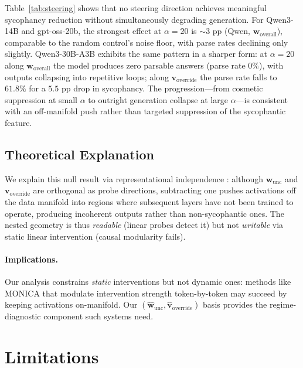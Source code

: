 \documentclass[11pt]{article}
\begin{document}
Table~\ref{tab:steering} shows that no steering direction achieves meaningful sycophancy reduction without simultaneously degrading generation.
For Qwen3-14B and gpt-oss-20b, the strongest effect at $\alpha = 20$ is $\sim$3 pp (Qwen, $\mathbf{w}_{\text{overall}}$), comparable to the random control's noise floor, with parse rates declining only slightly.
Qwen3-30B-A3B exhibits the same pattern in a sharper form: at $\alpha = 20$ along $\mathbf{w}_{\text{overall}}$ the model produces zero parsable answers (parse rate $0\%$), with outputs collapsing into repetitive loops; along $\mathbf{v}_{\text{override}}$ the parse rate falls to $61.8\%$ for a $5.5$ pp drop in sycophancy. The progression---from cosmetic suppression at small $\alpha$ to outright generation collapse at large $\alpha$---is consistent with an off-manifold push rather than targeted suppression of the sycophantic feature.

\subsection{Theoretical Explanation}

We explain this null result via representational independence \citep{wollschlager2025geometry}: although $\mathbf{w}_{\text{unc}}$ and $\mathbf{v}_{\text{override}}$ are orthogonal as probe directions, subtracting one pushes activations off the data manifold into regions where subsequent layers have not been trained to operate, producing incoherent outputs rather than non-sycophantic ones.
The nested geometry is thus \emph{readable} (linear probes detect it) but not \emph{writable} via static linear intervention (causal modularity fails).

\paragraph{Implications.}
Our analysis constrains \emph{static} interventions but not dynamic ones: methods like MONICA \citep{hu2025monica} that modulate intervention strength token-by-token may succeed by keeping activations on-manifold.
Our $(\hat{\mathbf{w}}_{\text{unc}}, \hat{\mathbf{v}}_{\text{override}})$ basis provides the regime-diagnostic component such systems need.


\section{Limitations}
\label{sec:limitations}
\end{document}
